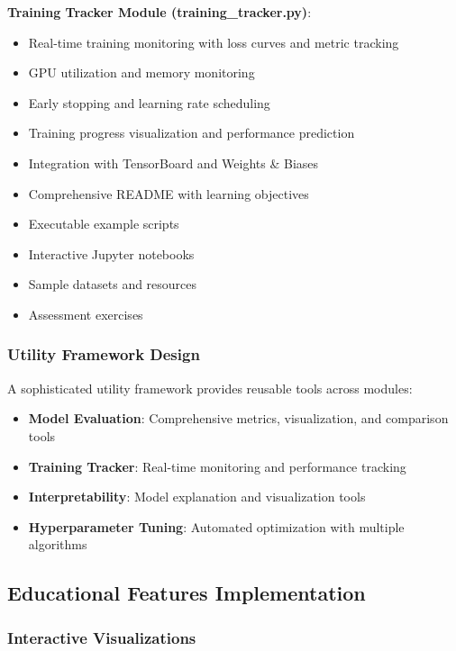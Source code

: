 \textbf{Training Tracker Module (training\_tracker.py)}:
\begin{itemize}
    \item Real-time training monitoring with loss curves and metric tracking
    \item GPU utilization and memory monitoring
    \item Early stopping and learning rate scheduling
    \item Training progress visualization and performance prediction
    \item Integration with TensorBoard and Weights \& Biases
\end{itemize}
\begin{itemize}
    \item Comprehensive README with learning objectives
    \item Executable example scripts
    \item Interactive Jupyter notebooks
    \item Sample datasets and resources
    \item Assessment exercises
\end{itemize}

\subsubsection{Utility Framework Design}

A sophisticated utility framework provides reusable tools across modules:

\begin{itemize}
    \item \textbf{Model Evaluation}: Comprehensive metrics, visualization, and comparison tools
    \item \textbf{Training Tracker}: Real-time monitoring and performance tracking
    \item \textbf{Interpretability}: Model explanation and visualization tools
    \item \textbf{Hyperparameter Tuning}: Automated optimization with multiple algorithms
\end{itemize}

\subsection{Educational Features Implementation}

\subsubsection{Interactive Visualizations}

